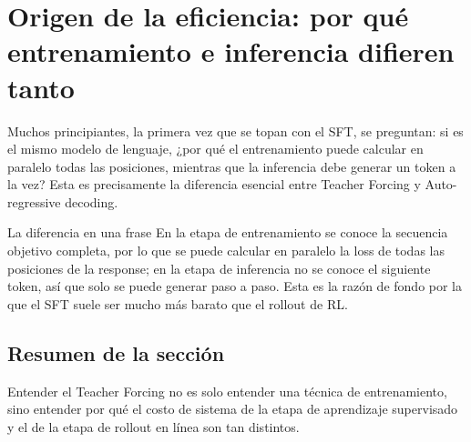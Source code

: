 \section{Origen de la eficiencia: por qué entrenamiento e inferencia difieren tanto}
Muchos principiantes, la primera vez que se topan con el SFT, se preguntan: si es el mismo modelo de lenguaje, ¿por qué el entrenamiento puede calcular en paralelo todas las posiciones, mientras que la inferencia debe generar un token a la vez? Esta es precisamente la diferencia esencial entre Teacher Forcing y Auto-regressive decoding.

\begin{importantbox}{La diferencia en una frase}
En la etapa de entrenamiento se conoce la secuencia objetivo completa, por lo que se puede calcular en paralelo la loss de todas las posiciones de la response; en la etapa de inferencia no se conoce el siguiente token, así que solo se puede generar paso a paso. Esta es la razón de fondo por la que el SFT suele ser mucho más barato que el rollout de RL.
\end{importantbox}

\subsection{Resumen de la sección}
Entender el Teacher Forcing no es solo entender una técnica de entrenamiento, sino entender por qué el costo de sistema de la etapa de aprendizaje supervisado y el de la etapa de rollout en línea son tan distintos.

\newpage
